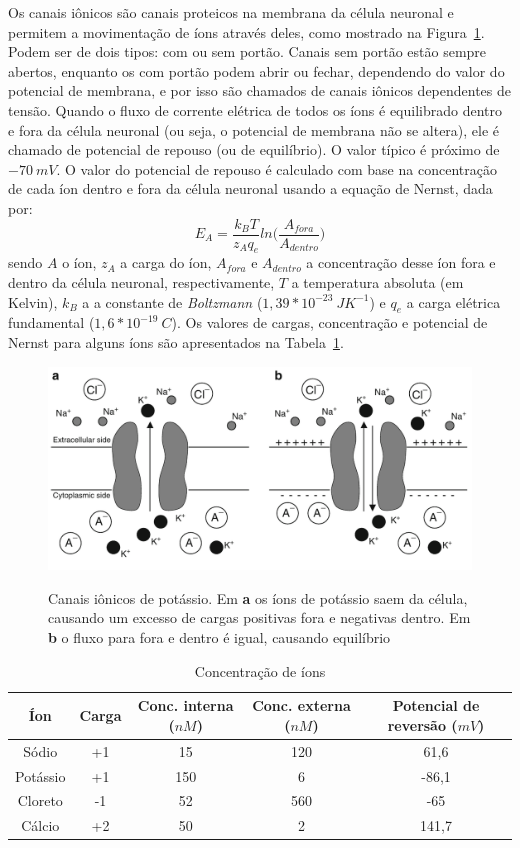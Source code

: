 Os canais iônicos são canais proteicos na membrana da célula neuronal e permitem a movimentação de íons através deles, como mostrado na Figura~\ref{fig:canaisions}. Podem ser de dois tipos: com ou sem portão. Canais sem portão estão sempre abertos, enquanto os com portão podem abrir ou fechar, dependendo do valor do potencial de membrana, e por isso são chamados de canais iônicos dependentes de tensão. Quando o fluxo de corrente elétrica de todos os íons é equilibrado dentro e fora da célula neuronal (ou seja, o potencial de membrana não se altera), ele é chamado de potencial de repouso (ou de equilíbrio). O valor típico é próximo de $-70\ mV$. O valor do potencial de repouso é calculado com base na concentração de cada íon dentro e fora da célula neuronal usando a equação de Nernst, dada por:
$$
E_A=\frac{k_BT}{z_Aq_e}ln\Big(\frac{A_{fora}}{A_{dentro}}\Big)
$$
sendo $A$ o íon, $z_A$ a carga do íon, $A_{fora}$ e $A_{dentro}$ a concentração desse íon fora e dentro da célula neuronal, respectivamente, $T$ a temperatura absoluta (em Kelvin), $k_B$ a a constante de \textit{Boltzmann} ($1,39*10^{-23}\ JK^{-1}$) e $q_e$ a carga elétrica fundamental ($1,6*10^{-19}\ C$). Os valores de cargas, concentração e potencial de Nernst para alguns íons são apresentados na Tabela~\ref{tab:concentracao_nernst}.

\begin{figure}[tb!]
	\centering
	\caption[Canais iônicos de potássio]{Canais iônicos de potássio. Em \textbf{a} os íons de potássio saem da célula, causando um excesso de cargas positivas fora e negativas dentro. Em \textbf{b} o fluxo para fora e dentro é igual, causando equilíbrio}
	\label{fig:canaisions}
	\includegraphics[width=0.7\linewidth]{figs/canais_ions}
	\\
	\cite{ermentrout_mathematical_2010}
\end{figure}

\begin{table}
	\centering
	\caption[Concentração de íons]{Concentração de íons}
	\label{tab:concentracao_nernst}
	\begin{tabular}{c|c|c|c|c}
		\hline
		Íon & Carga & Conc. interna ($nM$) & Conc. externa ($nM$) & Potencial de reversão ($mV$) \\
		\hline
		Sódio & +1 & 15 & 120 & 61,6 \\
		\hline
		Potássio & +1 & 150 & 6 & -86,1 \\
		\hline
		Cloreto & -1 & 52 & 560 & -65 \\
		\hline
		Cálcio & +2 & 50 & 2 & 141,7 \\
		\hline
	\end{tabular}
\end{table}

